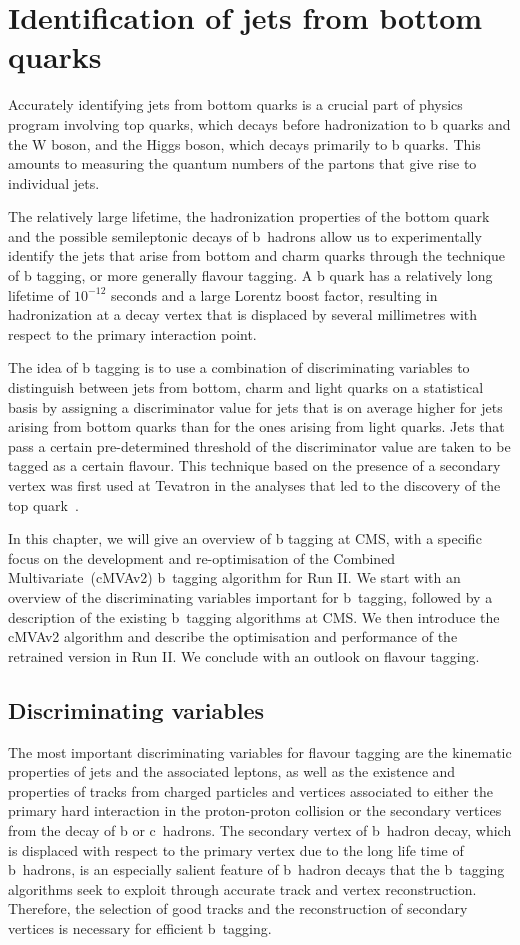 \chapter{Identification of jets from bottom quarks}
\label{sec:btagging}
Accurately identifying jets from bottom quarks is a crucial part of physics program involving top quarks, which decays before hadronization to b quarks and the W boson, and the Higgs boson, which decays primarily to b quarks. This amounts to measuring the quantum numbers of the partons that give rise to individual jets.

The relatively large lifetime, the hadronization properties of the bottom quark and the possible semileptonic decays of b~hadrons allow us to experimentally identify the jets that arise from bottom and charm quarks through the technique of b tagging, or more generally flavour tagging. A b quark has a relatively long lifetime of $10^{-12}$ seconds and a large Lorentz boost factor, resulting in hadronization at a decay vertex that is displaced by several millimetres with respect to the primary interaction point.

The idea of b tagging is to use a combination of discriminating variables to distinguish between jets from bottom, charm and light quarks on a statistical basis by assigning a discriminator value for jets that is on average higher for jets arising from bottom quarks than for the ones arising from light quarks. Jets that pass a certain pre-determined threshold of the discriminator value are taken to be tagged as a certain flavour. This technique based on the presence of a secondary vertex was first used at Tevatron in the analyses that led to the discovery of the top quark~\cite{Abe:1994st,Abe:1995hr}.

In this chapter, we will give an overview of b tagging at CMS, with a specific focus on the development and re-optimisation of the Combined Multivariate~(cMVAv2) b~tagging algorithm for Run II. We start with an overview of the discriminating variables important for b~tagging, followed by a description of the existing b~tagging algorithms at CMS. We then introduce the cMVAv2 algorithm and describe the optimisation and performance of the retrained version in Run II. We conclude with an outlook on flavour tagging. 

\section{Discriminating variables}
The most important discriminating variables for flavour tagging are the kinematic properties of jets and the associated leptons, as well as the existence and properties of tracks from charged particles and vertices associated to either the primary hard interaction in the proton-proton collision or the secondary vertices from the decay of b or c~hadrons. The secondary vertex of b~hadron decay, which is displaced with respect to the primary vertex due to the long life time of b~hadrons, is an especially salient feature of b~hadron decays that the b~tagging algorithms seek to exploit through accurate track and vertex reconstruction. Therefore, the selection of good tracks and the reconstruction of secondary vertices is necessary for efficient b~tagging.


